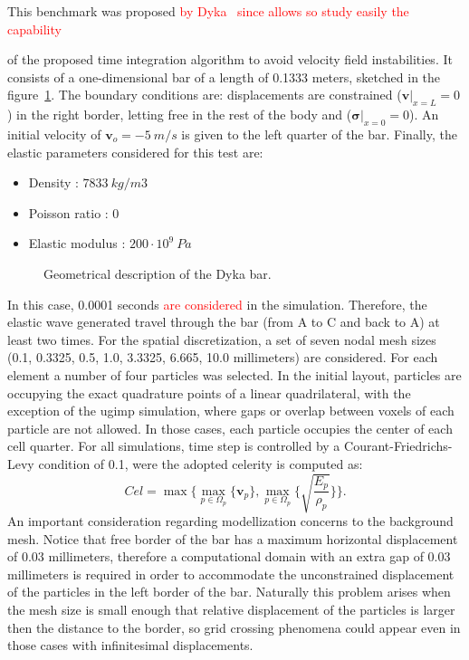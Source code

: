 \documentclass[preprint,12pt,a4paper]{elsarticle}
\newcommand{\vect}[1]{
  \ensuremath{\mathbf{{#1}}}
}
\newcommand{\tens}[1]{
  \ensuremath{\mathbf{{#1}}}
}
\newcommand{\PNA}[1]{
  \textcolor{red}{{#1}}
}
\begin{document}
This benchmark was proposed\PNA{by Dyka~\cite{Dyka1995} since allows so study easily the capability}
of the proposed time integration algorithm to avoid velocity
field instabilities. It consists of a one-dimensional bar of a length of 0.1333 meters, sketched in the
figure~\ref{fig:Dyka_Bar}. The boundary conditions are: displacements are constrained ($\vect{v} \rvert_{x=L} = 0$) in the right
border, letting free in the rest of the body and ($\tens{\sigma} \rvert_{x=0} =
0$). An initial velocity of $\vect{v}_o = - 5\ m/s$ is given to the
left quarter of the bar. Finally, the elastic parameters considered for this test are:
\begin{itemize} 
\item  Density : $7833\ kg/m3$
\item  Poisson ratio : $0$
\item  Elastic modulus : $200 \cdot 10^9\ Pa$
\end{itemize}
\begin{figure}\sidecaption
  \centering
  \resizebox{\hsize}{!}{
    }
  \caption{Geometrical description of the Dyka \cite{Dyka1995} bar.}
  \label{fig:Dyka_Bar}
\end{figure}
In this case, 0.0001 seconds\PNA{are considered }in the simulation. Therefore, the elastic wave generated travel through the bar
(from A to C and back to A) at least two times. For the spatial
discretization, a set of seven nodal mesh sizes (0.1, 0.3325, 0.5,
1.0, 3.3325, 6.665, 10.0 millimeters) are considered. For each element a number of
four particles was selected. In the initial layout, particles are
occupying the exact quadrature points of a linear quadrilateral, with
the exception of the \acrshort{ugimp} simulation, where gaps or overlap between
voxels of each particle are not allowed. In those cases, each particle
occupies the center of each cell quarter. For all simulations, time step
is controlled by a Courant-Friedrichs-Levy condition of 0.1, were the adopted
celerity is computed as:
\begin{equation}
  \label{eq:Cel}
  Cel = \max\{\max_{p \in \Omega_p}\{ \vect{v}_p \} , \max_{p \in \Omega_p}\{ \sqrt{\frac{E_p}{\rho_p}} \} \}.
\end{equation}
An important consideration regarding modellization concerns to the
background mesh. Notice that free border of the bar has a maximum
horizontal displacement of 0.03 millimeters, therefore 
a computational domain with an extra gap of 0.03 millimeters is
required in order to accommodate the unconstrained displacement of the
particles in the left border of the bar. Naturally this problem arises
when the mesh size is small enough that relative displacement of the
particles is larger then the distance to the border, so grid crossing
phenomena could appear even in those cases with infinitesimal
displacements.
\end{document}
